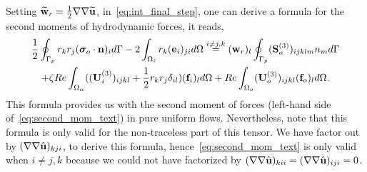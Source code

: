 Setting $\widetilde{\textbf{w}}_r = \frac{1}{2}\mathbf{\nabla}\mathbf{\nabla} \widetilde{\textbf{u}}$, in~\ref{eq:int_final_step}, one can derive a formula for the second moments of hydrodynamic forces, it reads, 
\begin{multline}
    \frac{1}{2}\intS[p]{r_kr_j ( \bm\sigma_{o}\cdot \textbf{n})_i}
    - 2\intO[i]{r_k (\textbf{e}_i)_{ji}}
    \overset{i\neq j,k}{=}
    (\textbf{w}_{r})_l\intS[p]{(\textbf{S}^{(3)}_{o})_{ijklm}n_m}\\
    + \zeta Re \intO{( (\textbf{U}_{i}^{(3)})_{ijkl} + \frac{1}{2} r_kr_j\delta_{il} ) (\textbf{f}_{i})_l}
    + Re\intO[o]{(\textbf{U}_{o}^{(3)})_{ijkl}  (\textbf{f}_{o})_l}.
    \label{eq:second_mom_text}
\end{multline}  
This formula provides us with the second moment of forces (left-hand side of~\ref{eq:second_mom_text}) in pure uniform flows. 
Nevertheless, note that this formula is only valid for the non-traceless part of this tensor. 
We have factor out by $(\mathbf{\nabla}\mathbf{\nabla}\hat{\textbf{u}})_{kji}$, to derive this formula, hence~\ref{eq:second_mom_text} is only valid when $i\neq j,k$ because we could not have factorized by $(\mathbf{\nabla}\mathbf{\nabla}\hat{\textbf{u}})_{kii} = (\mathbf{\nabla}\mathbf{\nabla}\hat{\textbf{u}})_{iji} = 0$. 
